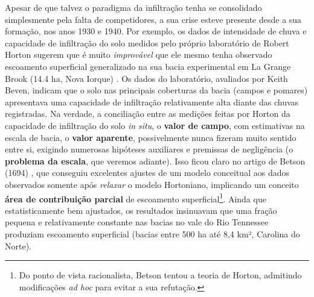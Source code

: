 \documentclass[./main.tex]{subfiles}
\begin{document}
\par Apesar de que talvez o \gls{paradigma} da infiltração tenha se consolidado simplesmente pela falta de competidores, a sua crise esteve presente desde a sua formação, nos anos 1930 e 1940. Por exemplo, os dados de intensidade de chuva e capacidade de infiltração do solo medidos pelo próprio laboratório de Robert Horton sugerem que é muito \textit{improvável} que ele mesmo tenha observado escoamento superficial generalizado na sua bacia experimental em La Grange Brook (14.4 ha, Nova Iorque) \cite{Beven2004c}. Os dados do laboratório, avaliados por Keith Beven, indicam que o solo nas principais coberturas da bacia (campos e pomares) apresentava uma capacidade de infiltração relativamente alta diante das chuvas registradas. Na verdade, a conciliação entre as medições feitas por Horton da capacidade de infiltração do solo \textit{in situ}, o \textbf{valor de campo}, com estimativas na escala de bacia, o \textbf{valor aparente}, possivelmente nunca fizeram muito sentido entre si, exigindo numerosas hipóteses auxiliares e premissas de negligência (o \textbf{problema da escala}, que veremos adiante). Isso ficou claro no artigo de Betson (1694) \cite{Betson1964}, que conseguiu excelentes ajustes de um modelo conceitual aos dados observados somente após \textit{relaxar} o modelo Hortoniano, implicando um conceito \textbf{área de contribuição parcial} de escoamento superficial\footnote{Do ponto de vista racionalista, Betson tentou  a teoria de Horton, admitindo modificações \textit{ad hoc} para evitar a sua refutação.}. Ainda que estatisticamente bem ajustados, os resultados insinuavam que uma fração pequena e relativamente constante nas bacias no vale do Rio Tennessee produziam escoamento superficial (bacias entre 500 ha até 8,4 km², Carolina do Norte).
\end{document}

